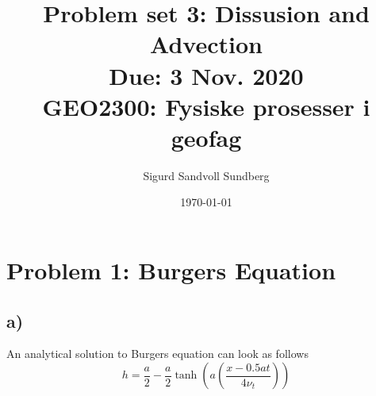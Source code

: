 \documentclass[10pt, a4paper]{amsart}
\title[Problem set 3]{Problem set 3: Dissusion and Advection\\
\normalsize{Due: 3 Nov. 2020} \\
  \hrulefill\small{GEO2300: Fysiske prosesser i geofag }\hrulefill}
\author[Sundberg]{Sigurd Sandvoll Sundberg}
\date{\today}
\begin{document}
\maketitle

\section{Problem 1: Burgers Equation}
\subsection{a)}
An analytical solution to Burgers equation can look as follows 
\begin{equation}
	h = \frac{a}{2} - \frac{a}{2}\tanh(a\left(\frac{x-0.5at}{4\nu_t}\right))
\end{equation}
\end{document}

